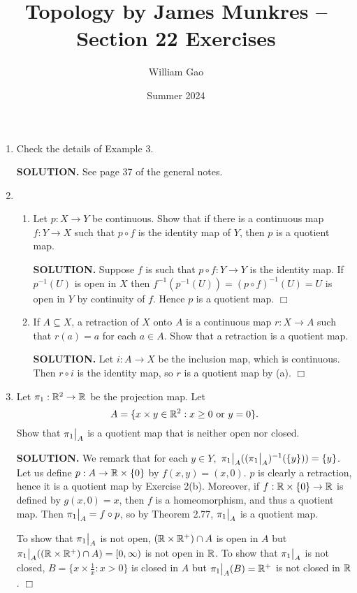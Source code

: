 \documentclass{article}
\title{Topology by James Munkres -- Section 22 Exercises}
\author{William Gao}
\date{Summer 2024}
\begin{document}
\maketitle

\begin{enumerate}
    \item Check the details of Example 3.

    {\bf SOLUTION.} See page 37 of the general notes.

    \item \begin{enumerate}
        \item Let $p: X \rightarrow Y$ be continuous. Show that if there is a continuous map $f: Y \rightarrow X$ such that $p \circ f$ is the identity map of $Y$, then $p$ is a quotient map.

        {\bf SOLUTION.} Suppose $f$ is such that $p \circ f: Y \rightarrow Y$ is the identity map. If $p^{-1}(U)$ is open in $X$ then $f^{-1}(p^{-1}(U)) = (p \circ f)^{-1}(U) = U$ is open in $Y$ by continuity of $f$. Hence $p$ is a quotient map. $\Box$

        \item If $A \subseteq X$, a retraction of $X$ onto $A$ is a continuous map $r: X \rightarrow A$ such that $r(a) = a$ for each $a \in A$. Show that a retraction is a quotient map.

        {\bf SOLUTION.} Let $i: A \rightarrow X$ be the inclusion map, which is continuous. Then $r \circ i$ is the identity map, so $r$ is a quotient map by (a). $\Box$
    \end{enumerate}

    \item Let $\pi_1 : \mathbb{R}^2 \rightarrow \mathbb{R}$ be the projection map. Let
    $$A = \{x \times y\in \mathbb{R}^2: x \geq 0 \text{ or } y = 0\}.$$
    Show that $\restr{\pi_1}{A}$ is a quotient map that is neither open nor closed.

    {\bf SOLUTION.} We remark that for each $y\in Y,$ $\restr{\pi_1}{A}((\restr{\pi_1}{A})^{-1}(\{y\})) = \{y\}$. Let us define $p: A \rightarrow \mathbb{R} \times \{0\}$ by $f(x, y) = (x, 0)$. $p$ is clearly a retraction, hence it is a quotient map by Exercise 2(b). Moreover, if $f: \mathbb{R} \times \{0\} \rightarrow \mathbb{R}$ is defined by $g(x, 0) = x$, then $f$ is a homeomorphism, and thus a quotient map. Then $\restr{\pi_1}{A} = f \circ p$, so by Theorem 2.77, $\restr{\pi_1}{A}$ is a quotient map.

    To show that $\restr{\pi_1}{A}$ is not open, $(\mathbb{R} \times \mathbb{R}^+) \cap A$ is open in $A$ but $\restr{\pi_1}{A} ((\reals \times \reals^+) \cap A) = [0, \infty)$ is not open in $\mathbb{R}$. To show that $\restr{\pi_1}{A}$ is not closed, $B = \{ x \times \frac1x: x > 0\}$ is closed in $A$ but $\restr{\pi_1}{A}(B) = \reals^+$ is not closed in $\mathbb{R}$. $\Box$


\end{enumerate}
\end{document}
